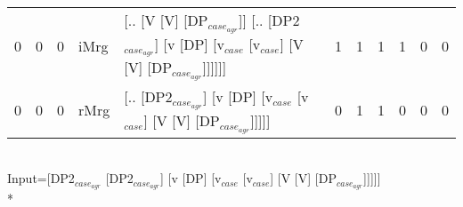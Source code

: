 \begin{tabularx}{\linewidth}{rrrlXrrrrrr}
   0 &       0 &   0 & iMrg & [.. [V [V] [DP$_{case_{agr}}$]] [.. [DP2$_{case_{agr}}$] [v [DP] [v$_{case}$ [v$_{case}$] [V [V] [DP$_{case_{agr}}$]]]]]]                            &            1 &             1 &             1 &                  1 &             0 &            0 \\
   0 &       0 &   0 & rMrg & [.. [DP2$_{case_{agr}}$] [v [DP] [v$_{case}$ [v$_{case}$] [V [V] [DP$_{case_{agr}}$]]]]]                                                       &            0 &             1 &             1 &                  0 &             0 &            0 \\
\hline
\end{tabularx}\endgroup\\
\begingroup\scriptsize Input=[DP2$_{case_{agr}}$ [DP2$_{case_{agr}}$] [v [DP] [v$_{case}$ [v$_{case}$] [V [V] [DP$_{case_{agr}}$]]]]]\\*
